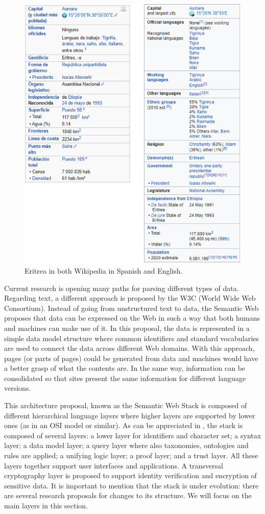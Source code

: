 \begin{figure}[!ht]
    \centering
        \includegraphics[width=.8\linewidth]{imagenes/EritreaWikipedia.png}
        \caption{Eritrea in both Wikipedia in Spanish and English.}
        \label{fig:eritreaWikipedia}
\end{figure}

Current research is opening many paths for parsing different types of data. Regarding text, a different approach is proposed by the W3C (World Wide Web Consortium). Instead of going from unstructured text to data, the Semantic Web proposes that data can be expressed on the Web in such a way that both humans and machines can make use of it. In this proposal, the data is represented in a simple data model structure where common identifiers and standard vocabularies are used to connect the data across different Web domains. With this approach, pages (or parts of pages) could be generated from data and machines would have a better grasp of what the contents are. In the same way, information can be consolidated so that sites present the same information for different language versions.

This architecture proposal, known as the Semantic Web Stack is composed of different hierarchical language layers where higher layers are supported by lower ones (as in an OSI model or similar). As can be appreciated in , the stack is composed of several layers: a lower layer for identifiers and character set; a syntax layer; a data model layer; a query layer where also taxonomies, ontologies and rules are applied; a unifying logic layer; a proof layer; and a trust layer. All these layers together support user interfaces and applications. A transversal cryptography layer is proposed to support identity verification and encryption of sensitive data. It is important to mention that the stack is under evolution: there are several research proposals for changes to its structure. We will focus on the main layers in this section.

